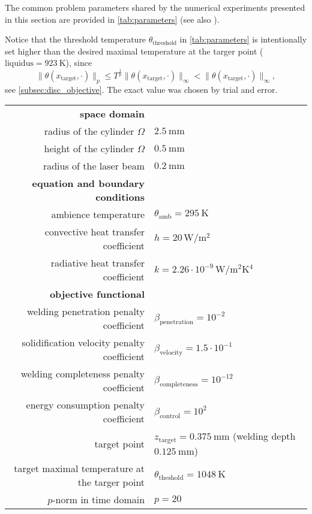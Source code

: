 The common problem parameters shared by the numerical experiments presented in this section are provided in \cref{tab:parameters} (see also \cite[\texttt{env/problem.py}]{optcontrol_github}).


Notice that the threshold temperature $\theta_\text{threshold}$ in \cref{tab:parameters} is intentionally set higher than the desired maximal temperature at the targer point ($\text{liquidus} = \SI{923}{\K}$), since
\begin{equation} \label{eq:p-norm_ineq}
	\|\theta(x_\text{target}, \cdot)\|_p \le T^\frac{1}{p} \|\theta(x_\text{target}, \cdot)\|_{\infty} < \|\theta(x_\text{target}, \cdot)\|_{\infty},
\end{equation}
see \cref{subsec:disc_objective}. The exact value was chosen by trial and error.

\begin{table}[ht]
	\begin{tabular}{rl}
		\textbf{space domain} \\
		radius of the cylinder $\Omega$ & $\SI{2.5}{\mm}$ \\
		height of the cylinder $\Omega$ & $\SI{0.5}{\mm}$ \\
		radius of the laser beam        & $\SI{0.2}{\mm}$\\[0.5em]

		\textbf{equation and boundary conditions} \\
		ambience temperature & $\theta_\text{amb} = \SI{295}{\K}$ \\
		convective heat transfer coefficient & $h = 20\, \si{\W\per\m^2}$\\
		radiative heat transfer coefficient & $k = 2.26 \cdot 10^{-9}\, \si{\W\per\m^2\K^4}$\\[0.5em]

		\textbf{objective functional} \\
		welding penetration penalty coefficient & $\beta_\text{penetration} = 10^{-2}$ \\
		solidification velocity penalty coefficient & $\beta_\text{velocity} = 1.5 \cdot 10^{-1}$ \\
		welding completeness penalty coefficient & $\beta_\text{completeness} = 10^{-12}$ \\
		energy consumption penalty coefficient & $\beta_\text{control} = 10^{2}$ \\
		target point & $z_\text{target} = \SI{0.375}{\mm}$ (welding depth $\SI{0.125}{\mm}$) \\
		target maximal temperature at the targer point & $\theta_\text{theshold} = \SI{1048}{\K}$ \\
		$p$-norm in time domain& $p = 20$\\[0.5em]


\end{tabular}
\end{table}
